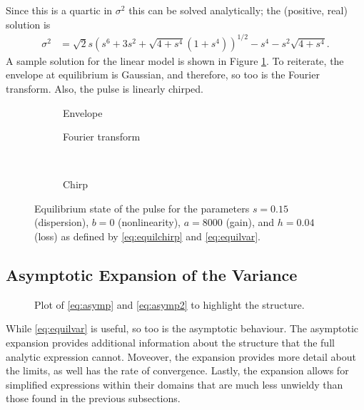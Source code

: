 Since this is a quartic in $\sigma^2$ this can be solved analytically; the (positive, real) solution is
\begin{align}
\label{eq:equilvar}
\sigma^2 &= \sqrt{2} s \left( s^6 + 3s^2 + \sqrt{4 + s^4} \left( 1 + s^4 \right) \right)^{1/2} - s^4 - s^2 \sqrt{4 + s^4}.
\end{align}
A sample solution for the linear model is shown in Figure \ref{fig:linear}. To reiterate, the envelope at equilibrium is Gaussian, and therefore, so too is the Fourier transform. Also, the pulse is linearly chirped. \\

\begin{figure}[tbp]
\centering
\begin{subfigure}{0.5\textwidth}
\centering

\caption{Envelope}
\end{subfigure}%
\begin{subfigure}{0.5\textwidth}
\centering

\caption{Fourier transform}
\end{subfigure} \\
\begin{subfigure}{0.5\textwidth}
\centering

\caption{Chirp}
\end{subfigure}
\caption[Envelope, Fourier transform, and chirp of the pulse---linear case.]{Equilibrium state of the pulse for the parameters $s = 0.15$ (dispersion), $b = 0$ (nonlinearity), $a = 8000$ (gain), and $h = 0.04$ (loss) as defined by \eqref{eq:equilchirp} and \eqref{eq:equilvar}.}
\label{fig:linear}
\end{figure}

\subsection{Asymptotic Expansion of the Variance}
\begin{figure}[tbp]
\centering

\caption{Plot of \eqref{eq:asymp} and \eqref{eq:asymp2} to highlight the structure.}
\label{fig:asympt}
\end{figure}
While \eqref{eq:equilvar} is useful, so too is the asymptotic behaviour. The asymptotic expansion provides additional information about the structure that the full analytic expression cannot. Moveover, the expansion provides more detail about the limits, as well has the rate of convergence. Lastly, the expansion allows for simplified expressions within their domains that are much less unwieldy than those found in the previous subsections. \\

